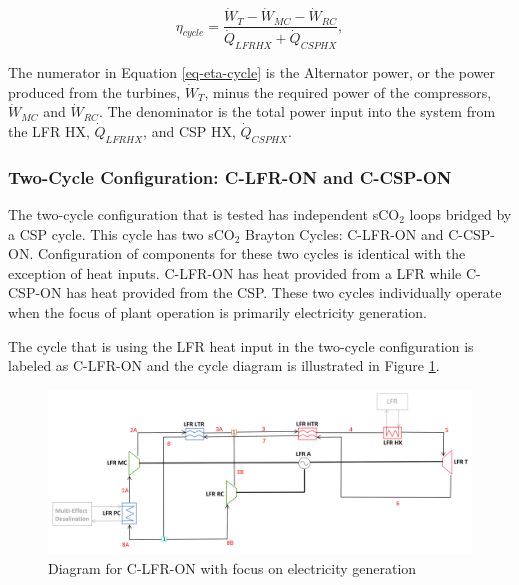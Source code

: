 \begin{paracol}{2}
\begin{equation}
    \label{eq-eta-cycle}
    \eta_{cycle} = \frac{\dot{W}_{T}-\dot{W}_{MC}-\dot{W}_{RC}}{\dot{Q}_{LFRHX}+\dot{Q}_{CSPHX}},
\end{equation}

The numerator in Equation \ref{eq-eta-cycle} is the Alternator power, or the power produced from the turbines, $\dot{W}_{T}$, minus the required power of the compressors, $\dot{W}_{MC}$ and $\dot{W}_{RC}$. The denominator is the total power input into the system from the LFR HX, $\dot{Q}_{LFRHX}$, and CSP HX, $\dot{Q}_{CSPHX}$.


\subsubsection{Two-Cycle Configuration: C-LFR-ON and C-CSP-ON} %

The two-cycle configuration that is tested has independent sCO$_{2}$ loops bridged by a CSP cycle. This cycle has two sCO$_{2}$ Brayton Cycles: C-LFR-ON and C-CSP-ON. Configuration of components for these two cycles is identical with the exception of heat inputs. C-LFR-ON has heat provided from a LFR while C-CSP-ON has heat provided from the CSP. These two cycles individually operate when the focus of plant operation is primarily electricity generation.

The cycle that is using the LFR heat input in the two-cycle configuration is labeled as C-LFR-ON and the cycle diagram is illustrated in Figure \ref{c-lfr-on}.

\end{paracol}
\begin{figure}[H] 
    \widefigure
    \includegraphics[width=\linewidth]{Definitions/c-lfr-on.pdf}
    \caption{Diagram for C-LFR-ON with focus on electricity generation\label{c-lfr-on}}
\end{figure}
